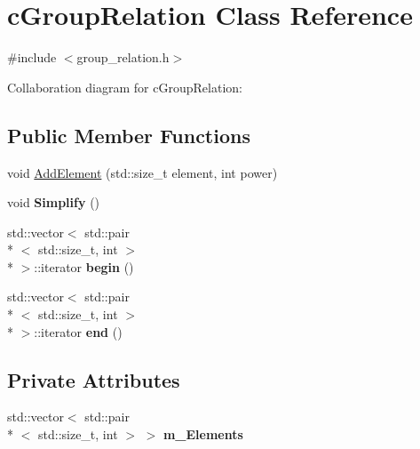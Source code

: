 \hypertarget{classcGroupRelation}{\section{c\-Group\-Relation Class Reference}
\label{classcGroupRelation}
}


{\ttfamily \#include $<$group\-\_\-relation.\-h$>$}



Collaboration diagram for c\-Group\-Relation\-:
\subsection*{Public Member Functions}
\begin{DoxyCompactItemize}
\item 
void \hyperlink{classcGroupRelation_ab02575ade57648d354388c57eca2be8a}{Add\-Element} (std\-::size\-\_\-t element, int power)
\item 
\hypertarget{classcGroupRelation_a3552e7ecdb7235d150e04a7041a958ba}{void {\bfseries Simplify} ()}\label{classcGroupRelation_a3552e7ecdb7235d150e04a7041a958ba}

\item 
\hypertarget{classcGroupRelation_a5801f724ac35ff61da1cab0605116322}{std\-::vector$<$ std\-::pair\\*
$<$ std\-::size\-\_\-t, int $>$\\*
 $>$\-::iterator {\bfseries begin} ()}\label{classcGroupRelation_a5801f724ac35ff61da1cab0605116322}

\item 
\hypertarget{classcGroupRelation_a9d6069b99a7503204f2375c4f022b556}{std\-::vector$<$ std\-::pair\\*
$<$ std\-::size\-\_\-t, int $>$\\*
 $>$\-::iterator {\bfseries end} ()}\label{classcGroupRelation_a9d6069b99a7503204f2375c4f022b556}

\end{DoxyCompactItemize}
\subsection*{Private Attributes}
\begin{DoxyCompactItemize}
\item 
\hypertarget{classcGroupRelation_a271a57882ceaa8f05bafcd52e492222b}{std\-::vector$<$ std\-::pair\\*
$<$ std\-::size\-\_\-t, int $>$ $>$ {\bfseries m\-\_\-\-Elements}}\label{classcGroupRelation_a271a57882ceaa8f05bafcd52e492222b}

\end{DoxyCompactItemize}
